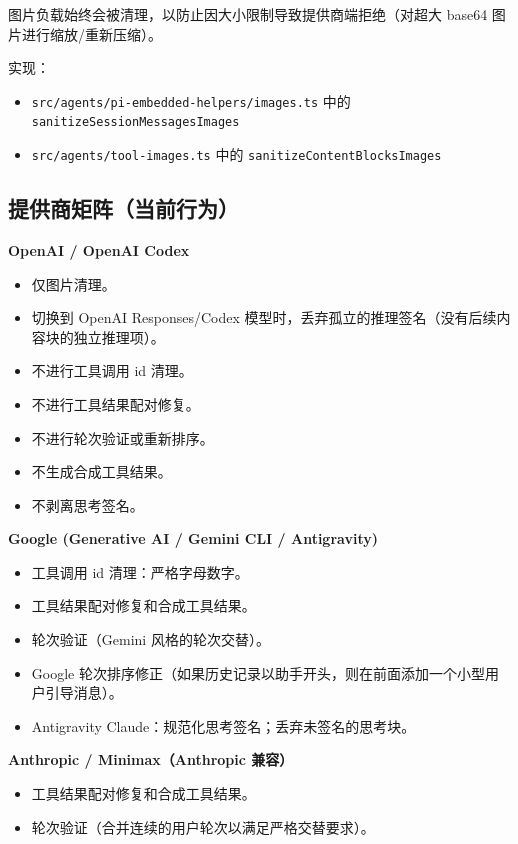 图片负载始终会被清理，以防止因大小限制导致提供商端拒绝（对超大 base64 图片进行缩放/重新压缩）。

实现：

\begin{itemize}
  \item \texttt{src/agents/pi-embedded-helpers/images.ts} 中的 \texttt{sanitizeSessionMessagesImages}
  \item \texttt{src/agents/tool-images.ts} 中的 \texttt{sanitizeContentBlocksImages}
\end{itemize}


\hrulefill


\subsection{提供商矩阵（当前行为）}


\textbf{OpenAI / OpenAI Codex}

\begin{itemize}
  \item 仅图片清理。
  \item 切换到 OpenAI Responses/Codex 模型时，丢弃孤立的推理签名（没有后续内容块的独立推理项）。
  \item 不进行工具调用 id 清理。
  \item 不进行工具结果配对修复。
  \item 不进行轮次验证或重新排序。
  \item 不生成合成工具结果。
  \item 不剥离思考签名。
\end{itemize}


\textbf{Google (Generative AI / Gemini CLI / Antigravity)}

\begin{itemize}
  \item 工具调用 id 清理：严格字母数字。
  \item 工具结果配对修复和合成工具结果。
  \item 轮次验证（Gemini 风格的轮次交替）。
  \item Google 轮次排序修正（如果历史记录以助手开头，则在前面添加一个小型用户引导消息）。
  \item Antigravity Claude：规范化思考签名；丢弃未签名的思考块。
\end{itemize}


\textbf{Anthropic / Minimax（Anthropic 兼容）}

\begin{itemize}
  \item 工具结果配对修复和合成工具结果。
  \item 轮次验证（合并连续的用户轮次以满足严格交替要求）。
\end{itemize}


